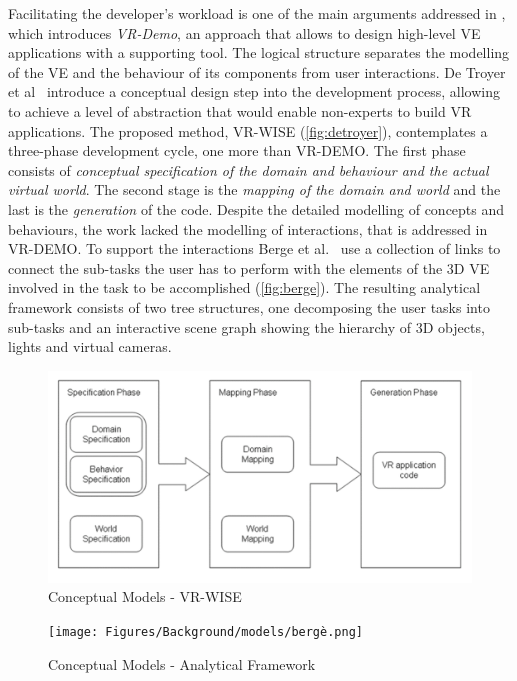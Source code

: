 Facilitating the developer's workload is one of the main arguments addressed in \cite{coninx_vr-demo_2006}, which introduces \textit{VR-Demo}, an approach that allows to design high-level \gls{VE} applications with a supporting tool. The logical structure separates the modelling of the VE and the behaviour of its components from user interactions. De Troyer et al~\cite{de_troyer_conceptual_2007} introduce a conceptual design step into the development process, allowing to achieve a level of abstraction that would enable non-experts to build VR applications. The proposed method, VR-WISE (\autoref{fig:detroyer}), contemplates a three-phase development cycle, one more than VR-DEMO. The first phase consists of \textit{conceptual specification of the domain and behaviour and the actual virtual world}. The second stage is the \textit{mapping of the domain and world} and the last is the \textit{generation} of the code. Despite the detailed modelling of concepts and behaviours, the work lacked the modelling of interactions, that is addressed in VR-DEMO. To support the interactions Berge et al.~\cite{berge_towards_2014} use a collection of links to connect the sub-tasks the user has to perform with the elements of the 3D VE involved in the task to be accomplished (\autoref{fig:berge}). The resulting analytical framework consists of two tree structures, one decomposing the user tasks into sub-tasks and an interactive scene graph showing the hierarchy of 3D objects, lights and virtual cameras. 

\begin{figure}[htbp]
    \centering
    \includegraphics[width=\textwidth]{Figures/Background/models/detroyer.png}
    \caption{Conceptual Models - VR-WISE}
    \label{fig:detroyer}
\end{figure}

\begin{figure}[htbp]
    \centering
    \texttt{[image: Figures/Background/models/bergè.png]}
    \caption{Conceptual Models - Analytical Framework}
    \label{fig:berge}
\end{figure}

